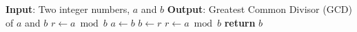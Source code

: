 \State \textbf{Input}: Two integer numbers, $a$ and $b$
\State \textbf{Output}:  Greatest Common Divisor (GCD) of $a$ and $b$
\State
{}
\State $r\gets a\bmod b$
\State $a\gets b$
\State $b\gets r$
\State $r\gets a\bmod b$
\EndWhile\label{euclidendwhile}
\State \textbf{return} $b$
\EndProcedure
